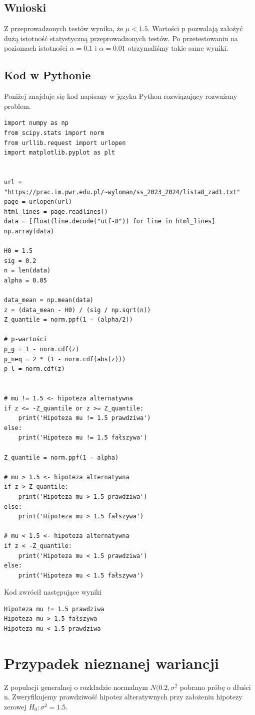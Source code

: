 \documentclass{article}
\begin{document}
\subsection{Wnioski}
Z przeprowadzonych testów wynika, że $\mu<1.5$. Wartości p pozwalają założyć dużą istotność statystyczną przeprowadzonych testów. Po przetestowaniu na poziomach istotności $\alpha=0.1$ i $\alpha=0.01$ otrzymaliśmy takie same wyniki. 

\subsection{Kod w Pythonie}
Poniżej znajduje się kod napisany w języku Python rozwiązujący rozważany problem.
\begin{verbatim}
import numpy as np
from scipy.stats import norm
from urllib.request import urlopen
import matplotlib.pyplot as plt


url = "https://prac.im.pwr.edu.pl/~wyloman/ss_2023_2024/lista8_zad1.txt"
page = urlopen(url)
html_lines = page.readlines()
data = [float(line.decode("utf-8")) for line in html_lines]
np.array(data)

H0 = 1.5
sig = 0.2
n = len(data)
alpha = 0.05

data_mean = np.mean(data)
z = (data_mean - H0) / (sig / np.sqrt(n))
Z_quantile = norm.ppf(1 - (alpha/2))

# p-wartości
p_g = 1 - norm.cdf(z)
p_neq = 2 * (1 - norm.cdf(abs(z)))
p_l = norm.cdf(z)


# mu != 1.5 <- hipoteza alternatywna
if z <= -Z_quantile or z >= Z_quantile:
    print('Hipoteza mu != 1.5 prawdziwa')
else: 
    print('Hipoteza mu != 1.5 fałszywa')

Z_quantile = norm.ppf(1 - alpha)

# mu > 1.5 <- hipoteza alternatywna
if z > Z_quantile:
    print('Hipoteza mu > 1.5 prawdziwa')    
else:
    print('Hipoteza mu > 1.5 fałszywa')

# mu < 1.5 <- hipoteza alternatywna
if z < -Z_quantile:
    print('Hipoteza mu < 1.5 prawdziwa')    
else:
    print('Hipoteza mu < 1.5 fałszywa')
\end{verbatim}
Kod zwrócił następujące wyniki
\begin{verbatim}
Hipoteza mu != 1.5 prawdziwa
Hipoteza mu > 1.5 fałszywa
Hipoteza mu < 1.5 prawdziwa
\end{verbatim}


\section{Przypadek nieznanej wariancji}
Z populacji generalnej o rozkładzie normalnym $N(0.2, \sigma^{2}$ pobrano próbę o dłuści n. Zweryfikujemy prawdziwość hipotez alteratywnych przy założeniu hipotezy zerowej $H_{0}: \sigma^{2}= 1.5$.
\end{document}
